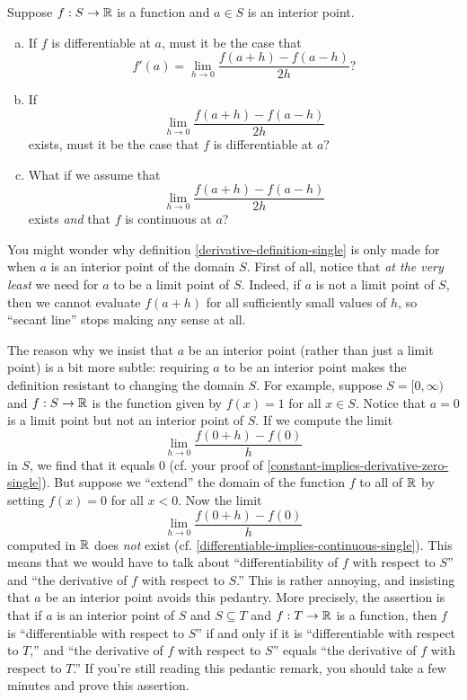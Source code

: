 \begin{exercise}
	Suppose $f : S \to \mathbb{R}$ is a function and $a \in S$ is an interior point. 
	\begin{enumerate}[(a)]
		\item If $f$ is differentiable at $a$, must it be the case that
		\[ f'(a) = \lim_{h \to 0} \frac{f(a+h)-f(a-h)}{2h} ? \]
		\item If 
		\[ \lim_{h \to 0} \frac{f(a+h)-f(a-h)}{2h} \]
		exists, must it be the case that $f$ is differentiable at $a$?
		\item What if we assume that 
		\[ \lim_{h \to 0} \frac{f(a+h)-f(a-h)}{2h} \]
		exists \emph{and} that $f$ is continuous at $a$? 
	\end{enumerate}
\end{exercise}

\begin{pedanticremark}
	You might wonder why definition \cref{derivative-definition-single} is only made for when $a$ is an interior point of the domain $S$. First of all, notice that \emph{at the very least} we need for $a$ to be a limit point of $S$. Indeed, if $a$ is not a limit point of $S$, then we cannot evaluate $f(a+h)$ for all sufficiently small values of $h$, so ``secant line'' stops making any sense at all. 
	
	The reason why we insist that $a$ be an interior point (rather than just a limit point) is a bit more subtle: requiring $a$ to be an interior point makes the definition resistant to changing the domain $S$. For example, suppose $S = [0,\infty)$ and $f : S \to \mathbb{R}$ is the function given by $f(x) = 1$ for all $x \in S$. Notice that $a = 0$ is a limit point but not an interior point of $S$. If we compute the limit
	\[ \lim_{h \to 0} \frac{f(0 + h)- f(0)}{h} \]
	in $S$, we find that it equals 0 (cf. your proof of  \cref{constant-implies-derivative-zero-single}). But suppose we ``extend'' the domain of the function $f$ to all of $\mathbb{R}$ by setting $f(x) = 0$ for all $x < 0$. Now the limit
	\[ \lim_{h \to 0} \frac{f(0 + h)- f(0)}{h} \]
	computed in $\mathbb{R}$ does \emph{not} exist (cf. \cref{differentiable-implies-continuous-single}). This means that we would have to talk about ``differentiability of $f$ with respect to $S$'' and ``the derivative of $f$ with respect to $S$.'' This is rather annoying, and insisting that $a$ be an interior point avoids this pedantry. More precisely, the assertion is that if $a$ is an interior point of $S$ and $S \subseteq T$ and $f : T \to \mathbb{R}$ is a function, then $f$ is ``differentiable with respect to $S$'' if and only if it is ``differentiable with respect to $T$,'' and ``the derivative of $f$ with respect to $S$'' equals ``the derivative of $f$ with respect to $T$.'' If you're still reading this pedantic remark, you should take a few minutes and prove this assertion. 
\end{pedanticremark}

